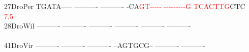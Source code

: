\documentclass[11pt,twoside,reqno,a4paper]{article}
\begin{document}
{27\hspace*{2\charwidth}DroPer	TGATA-----	----------	----------	-CA\textcolor{Red}{G}\textcolor{Red}{T}\textcolor{Red}{-}\textcolor{Red}{-}\textcolor{Red}{-}\textcolor{Red}{-}\textcolor{Red}{-}	\textcolor{Red}{-}\textcolor{Red}{-}\textcolor{Red}{-}\textcolor{Red}{-}\textcolor{Red}{-}\textcolor{Red}{-}\textcolor{Red}{-}\textcolor{Red}{-}\textcolor{Red}{-}\textcolor{Red}{G}	\textcolor{Red}{T}\textcolor{Red}{C}\textcolor{Red}{A}\textcolor{Red}{C}\textcolor{Red}{T}\textcolor{Red}{T}\textcolor{Red}{G}CTC	\\
\hspace*{4\charwidth}\hspace*{7\charwidth}\hspace*{1\charwidth}\hspace*{1\charwidth}\hspace*{1\charwidth}\hspace*{33\charwidth}\textcolor{Red}{7.5}\hspace*{1\charwidth}\hspace*{1\charwidth}\hspace*{1\charwidth}\\
28\hspace*{2\charwidth}DroWil	----------	----------	----------	----------	----------	----------	\\
\hspace*{4\charwidth}\hspace*{7\charwidth}\hspace*{1\charwidth}\hspace*{1\charwidth}\hspace*{1\charwidth}\hspace*{1\charwidth}\hspace*{1\charwidth}\hspace*{1\charwidth}\\
41\hspace*{2\charwidth}DroVir	----------	----------	----------	--AGTGCG--	----------	----------	\\
\hspace*{4\charwidth}\hspace*{7\charwidth}\hspace*{1\charwidth}\hspace*{1\charwidth}\hspace*{1\charwidth}\hspace*{1\charwidth}\hspace*{1\charwidth}\hspace*{1\charwidth}\\
}
\end{document}
